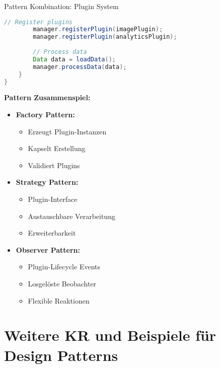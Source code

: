\begin{example2}[breakable]{Pattern Kombination: Plugin System}
\begin{lstlisting}[language=Java, style=basesmol]
        // Register plugins
        manager.registerPlugin(imagePlugin);
        manager.registerPlugin(analyticsPlugin);
        
        // Process data
        Data data = loadData();
        manager.processData(data);
    }
}
\end{lstlisting}

\textbf{Pattern Zusammenspiel:}
\begin{itemize}
    \item \textbf{Factory Pattern:}
    \begin{itemize}
        \item Erzeugt Plugin-Instanzen
        \item Kapselt Erstellung
        \item Validiert Plugins
    \end{itemize}
    
    \item \textbf{Strategy Pattern:}
    \begin{itemize}
        \item Plugin-Interface
        \item Austauschbare Verarbeitung
        \item Erweiterbarkeit
    \end{itemize}
    
    \item \textbf{Observer Pattern:}
    \begin{itemize}
        \item Plugin-Lifecycle Events
        \item Losgelöste Beobachter
        \item Flexible Reaktionen
    \end{itemize}
\end{itemize}
\end{example2}

\section{Weitere KR und Beispiele für Design Patterns}

